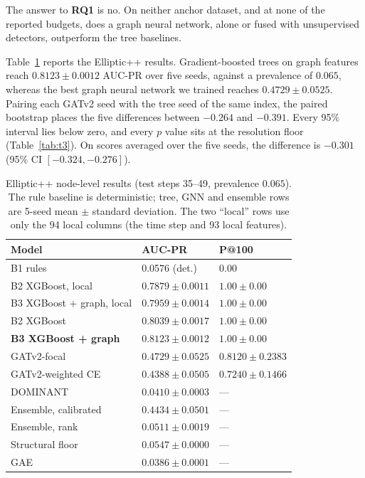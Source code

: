 \documentclass[conference]{IEEEtran}
\newcommand{\RQ}[1]{\textbf{RQ#1}}
\begin{document}
The answer to \RQ{1} is no. On neither anchor dataset, and at none of the
reported budgets, does a graph neural network, alone or fused with unsupervised
detectors, outperform the tree baselines.

Table~\ref{tab:t1} reports the Elliptic++ results. Gradient-boosted trees on
graph features reach $0.8123 \pm 0.0012$ AUC-PR over five seeds, against a
prevalence of $0.065$, whereas the best graph neural network we trained reaches
$0.4729 \pm 0.0525$. Pairing each GATv2 seed with the tree seed of the same
index, the paired bootstrap places the five differences between $-0.264$ and
$-0.391$. Every 95\% interval lies below zero, and every $p$ value sits at the
resolution floor (Table~\ref{tab:t3}). On scores averaged over the five seeds,
the difference is $-0.301$ (95\% CI $[-0.324, -0.276]$).

\begin{table}[t]
\caption{Elliptic++ node-level results (test steps 35--49, prevalence
$0.065$). The rule baseline is deterministic; tree, GNN and ensemble rows are
5-seed mean $\pm$ standard deviation. The two ``local'' rows use only the 94
local columns (the time step and 93 local features).}
\label{tab:t1}
\centering
\footnotesize
\setlength{\tabcolsep}{4pt}
\begin{tabular}{lll}
\toprule
Model & AUC-PR & P@100 \\
\midrule
B1 rules & 0.0576 (det.) & 0.00 \\
B2 XGBoost, local & $0.7879 \pm 0.0011$ & $1.00 \pm 0.00$ \\
B3 XGBoost + graph, local & $0.7959 \pm 0.0014$ & $1.00 \pm 0.00$ \\
B2 XGBoost & $0.8039 \pm 0.0017$ & $1.00 \pm 0.00$ \\
\textbf{B3 XGBoost + graph} & $\mathbf{0.8123 \pm 0.0012}$ & $\mathbf{1.00 \pm 0.00}$ \\
GATv2-focal & $0.4729 \pm 0.0525$ & $0.8120 \pm 0.2383$ \\
GATv2-weighted CE & $0.4388 \pm 0.0505$ & $0.7240 \pm 0.1466$ \\
DOMINANT & $0.0410 \pm 0.0003$ & --- \\
Ensemble, calibrated & $0.4434 \pm 0.0501$ & --- \\
Ensemble, rank & $0.0511 \pm 0.0019$ & --- \\
Structural floor & $0.0547 \pm 0.0000$ & --- \\
GAE & $0.0386 \pm 0.0001$ & --- \\
\bottomrule
\end{tabular}
\end{table}
\end{document}
